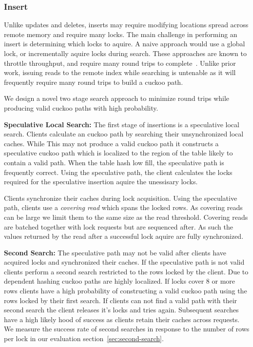 \subsubsection{Insert}
\label{sec:insert}

Unlike updates and deletes, inserts may require modifying
locations spread across remote memory and require many
locks. The main challenge in performing an insert is
determining which locks to aquire. A naive approach would
use a global lock, or incrementally aquire locks during
search. These approaches are known to throttle throughput,
and require many round trips to
complete~\cite{cuckoo-improvements}. Unlike prior work,
issuing reads to the remote index while searching is
untenable as it will frequently require many round trips to
build a cuckoo path.

We design a novel two stage search approach to minimize
round trips while producing valid cuckoo paths with high
probability.

\textbf{Speculative Local Search:} The first stage of
insertions is a speculative local search. Clients calculate
an cuckoo path by searching their unsynchronized local
caches. While This may not produce a valid cuckoo path it
constructs a speculative cuckoo path which is localized to
the region of the table likely to contain a valid path. When
the table hash low fill, the speculative path is frequently
correct. Using the speculative path, the client calculates
the locks required for the speculative insertion aquire the
unessisary locks.

Clients synchronize their caches during lock acquisition.
Using the speculative path, clients use a \textit{covering
read} which spans the locked rows. As covering reads can be
large we limit them to the same size as the read threshold.
Covering reads are batched together with lock requests but
are sequenced after. As such the values returned by the read
after a successful lock aquire are fully synchronized.

\textbf{Second Search:} The speculative path may not be
valid after clients have acquired locks and synchronized
their caches. If the speculative path is not valid clients
perform a second search restricted to the rows locked by the
client. Due to dependent hashing cuckoo paths are highly
localized. If locks cover 8 or more rows clients have a high
probability of constructing a valid cuckoo path using the
rows locked by their first search. If clients can not find a
valid path with their second search the client releases it's
locks and tries again. Subsequent searches have a high
likely hood of success as clients retain their caches across
requests. We measure the success rate of second searches in
response to the number of rows per lock in our evaluation
section~\ref{sec:second-search}.

